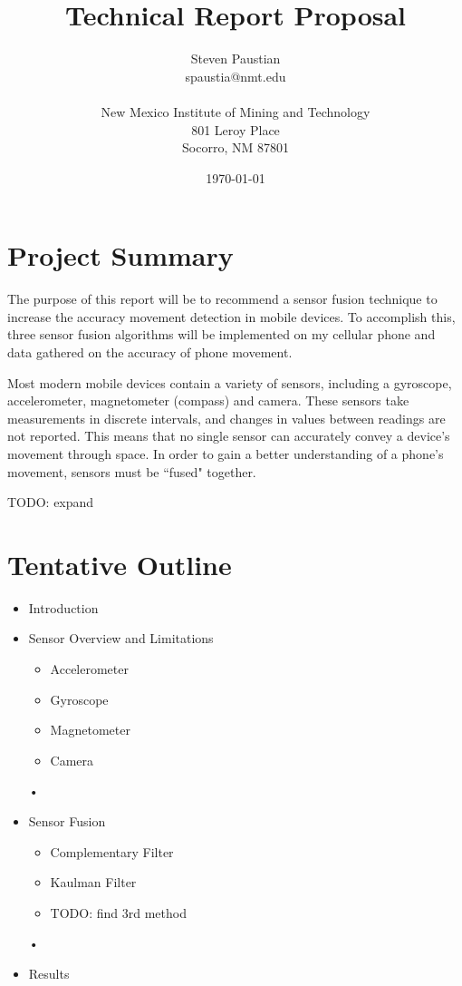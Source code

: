 \documentclass[11pt]{article}
\title{Technical Report Proposal}
\author{\begin{tabular}{c}
Steven Paustian \\
spaustia@nmt.edu \\ \\
  New Mexico Institute of Mining and Technology \\
  801 Leroy Place\\
Socorro, NM 87801
\end{tabular}}
\date{\today}
\begin{document}
\maketitle



\tableofcontents



\section{Project Summary}

The purpose of this report will be to recommend a sensor fusion technique to increase the accuracy movement detection in mobile devices.  To accomplish this, three sensor fusion algorithms will be implemented on my cellular phone and data gathered on the accuracy of phone movement.

Most modern mobile devices contain a variety of sensors, including a gyroscope, accelerometer, magnetometer (compass) and camera.  These sensors take measurements in discrete intervals, and changes in values between readings are not reported.  This means that no single sensor can accurately convey a device's movement through space.  In order to gain a better understanding of a phone's movement, sensors must be ``fused" together.

TODO: expand


\section{Tentative Outline}
\begin{itemize}
\item{ Introduction }

\item { Sensor Overview and Limitations

 \begin{itemize}
\item Accelerometer
\item Gyroscope
\item Magnetometer
\item Camera

\end{itemize}• 
}

\item { Sensor Fusion

\begin{itemize}
\item Complementary Filter
\item Kaulman Filter
\item TODO: find 3rd method

\end{itemize}•

 }

\item Results



\end{itemize}
\end{document}

